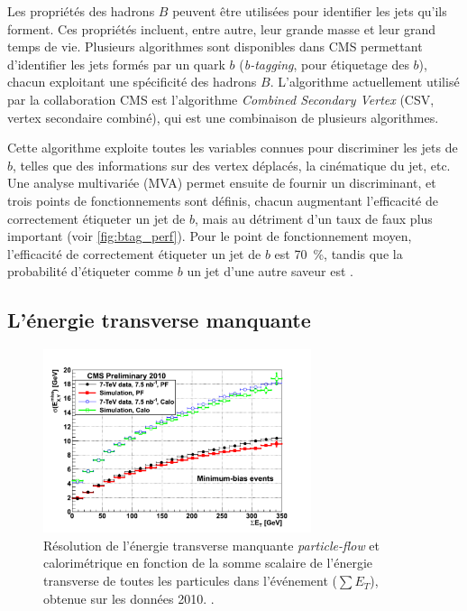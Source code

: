 Les propriétés des hadrons $B$ peuvent être utilisées pour identifier les jets qu'ils forment. Ces propriétés incluent, entre autre, leur grande masse et leur grand temps de vie. Plusieurs algorithmes sont disponibles dans CMS permettant d'identifier les jets formés par un quark $b$ (\emph{b-tagging}, pour étiquetage des $b$), chacun exploitant une spécificité des hadrons $B$. L'algorithme actuellement utilisé par la collaboration CMS est l'algorithme \emph{Combined Secondary Vertex} (CSV, vertex secondaire combiné), qui est une combinaison de plusieurs algorithmes.

Cette algorithme exploite toutes les variables connues pour discriminer les jets de $b$, telles que des informations sur des vertex déplacés, la cinématique du jet, etc. Une analyse multivariée (MVA) permet ensuite de fournir un discriminant, et trois points de fonctionnements sont définis, chacun augmentant l'efficacité de correctement étiqueter un jet de $b$, mais au détriment d'un taux de faux plus important (voir \cref{fig:btag_perf}). Pour le point de fonctionnement moyen, l'efficacité de correctement étiqueter un jet de $b$ est \tilde\SI{70}{\%}, tandis que la probabilité d'étiqueter comme $b$ un jet d'une autre saveur est .

\subsection{L'énergie transverse manquante}

\begin{figure}[tbp]
    \centering
    \includegraphics[width=0.7\textwidth]{chapitre3/figs/pf_met_resolution.png}
    \caption{Résolution de l'énergie transverse manquante \emph{particle-flow} et calorimétrique en fonction de la somme scalaire de l'énergie transverse de toutes les particules dans l'événement ($\sum E_T$), obtenue sur les données 2010. \citep{cms_pf_jets}.}
    \label{fig:met_resolution}
\end{figure}

